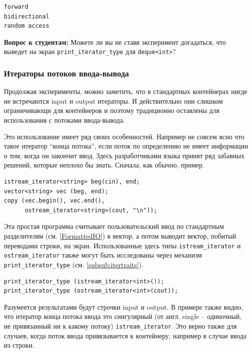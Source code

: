 \documentclass[a4paper,12pt,oneside]{article}
\newif\ifanswers
\begin{document}
\begin{verbatim}
forward
bidirectional
random access
\end{verbatim}

\textbf{Вопрос к студентам:} Можете ли вы не ставя эксперимент догадаться, что выведет на экран \lstinline!print_iterator_type! для \lstinline!deque<int>!?

\ifanswers
Разумеется random access. Догадаться можно по наличию у деки оператора квадратные скобки.
\fi

\subsubsection{Итераторы потоков ввода-вывода}\label{subsub:streamiter}

Продолжая эксперименты, можно заметить, что в стандартных контейнерах нигде не встречаются input и output итераторы. И действительно они слишком ограничивающи для контейнеров и поэтому традиционно оставлены для использования с потоками ввода-вывода.

Это использование имеет ряд своих особенностей. Например не совсем ясно что такое итератор ``конца потока'', если поток по определению не имеет информации о том, когда он закончит ввод. Здесь разработчиками языка принят ряд забавных решений, которые неплохо бы знать. Сначала, как обычно, пример.

\begin{lstlisting}
istream_iterator<string> beg(cin), end;
vector<string> vec (beg, end);
copy (vec.begin(), vec.end(), 
      ostream_iterator<string>(cout, "\n"));
\end{lstlisting}

Эта простая программа считывает пользовательский ввод по стандартным разделителям (см. \ref{FormattedIO}) в вектор, а потом выводит вектор, побитый переводами строки, на экран. Использованные здесь типы \lstinline!istream_iterator! и \lstinline!ostream_iterator! также могут быть исследованы через механизм \lstinline!print_iterator_type! (см. \ref{subsub:itertraits}).

\begin{lstlisting}
print_iterator_type (istream_iterator<int>()); 
print_iterator_type (ostream_iterator<int>(cout));
\end{lstlisting}

Разумеется результатами будут строчки input и output. В примере также видно, что итератор конца потока ввода это сингулярный (от англ. single -- одиночный, не привязанный ни к какому потоку) \lstinline!istream_iterator!. Это верно также для случаев, когда поток ввода привязывается к контейнеру, например в случае ввода из строки.
\end{document}
